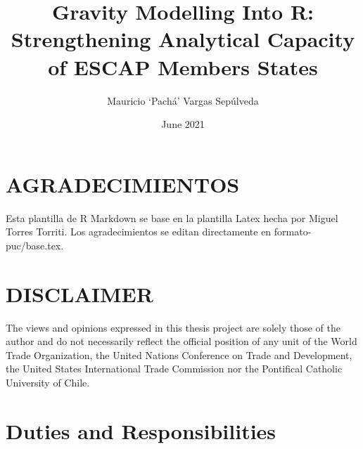 \documentclass[12pt,reqno,oneside,pdftex]{formato-puc/puctesis} %
\begin{document}
\title{Gravity Modelling Into R: Strengthening Analytical Capacity of
ESCAP Members States}
\author{Mauricio `Pachá' Vargas Sepúlveda}

\date         {June 2021}
\dedication   {To my family, friends, and all the valuable people from
PUC.}

\PageNumbersFootCentered
{}
\maketitle

\chapter*{AGRADECIMIENTOS}
Esta plantilla de R Markdown se base en la plantilla Latex hecha por
Miguel Torres Torriti. Los agradecimientos se editan directamente en formato-puc/base.tex.
\par

\cleardoublepage
\tableofcontents
\listoffigures          
\listoftables           
\cleardoublepage

\chapter*{DISCLAIMER}

The views and opinions expressed in this thesis project are solely those of the author and do not necessarily reflect the official position of any unit of the World Trade Organization, the United Nations Conference on Trade and Development, the United States International Trade Commission nor the Pontifical Catholic University of Chile.

\cleardoublepage %

\NoChapterPageNumber           %

\chapter{Duties and Responsibilities}
\end{document}
